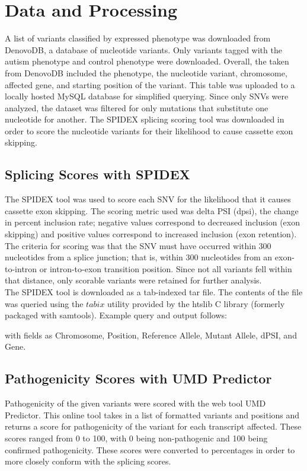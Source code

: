 \documentclass[12pt]{article}
\begin{document}
\section{Data and Processing}
A list of variants classified by expressed phenotype was downloaded from 
DenovoDB, a database of nucleotide variants. Only variants tagged with the
autism phenotype and control phenotype were downloaded. Overall, the 
taken from DenovoDB included the phenotype, the nucleotide variant, chromosome,
affected gene, and starting position of the variant. This table was uploaded
to a locally hosted MySQL database for simplified querying. Since only SNVs 
were analyzed, the dataset was filtered for only mutations that substitute
one nucleotide for another. The SPIDEX splicing scoring tool was downloaded 
in order to score the nucleotide variants for their likelihood to cause 
cassette exon skipping.

\subsection{Splicing Scores with SPIDEX}
The SPIDEX tool was used to score each SNV for the likelihood that
it causes cassette exon skipping. The scoring metric used was delta PSI (dpsi),
the change in percent inclusion rate; negative values correspond to decreased
inclusion (exon skipping) and positive values correspond to increased inclusion 
(exon retention). The criteria for scoring was that the SNV must have occurred
within 300 nucleotides from a splice junction; that is, within 300 
nucleotides from an exon-to-intron or intron-to-exon transition position. Since
not all variants fell within that distance, only scorable variants were 
retained for further analysis.
\\[\baselineskip]
The SPIDEX tool is downloaded as a tab-indexed tar file. The contents of the
file was queried using the $tabix$ utility provided by the htslib C library 
(formerly packaged with samtools). Example query and output follows:



with fields as Chromosome, Position, Reference Allele, Mutant Allele, dPSI, 
and Gene.

\subsection{Pathogenicity Scores with UMD Predictor}
Pathogenicity of the given variants were scored with the web tool UMD 
Predictor. This online tool takes in a list of formatted variants and positions
and returns a score for pathogenicity of the variant for each transcript 
affected. These scores ranged from 0 to 100, with 0 being non-pathogenic and
100 being confirmed pathogenicity. These scores were converted to percentages
in order to more closely conform with the splicing scores.
\end{document}
